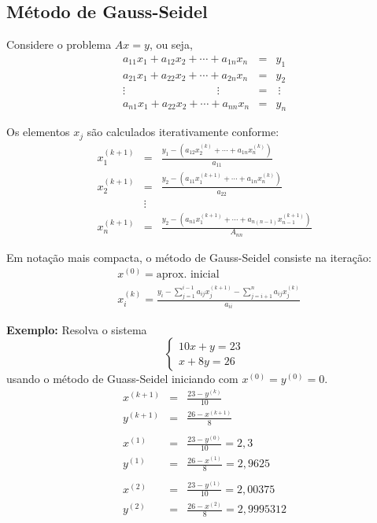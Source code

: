 
\fi

\subsection{Método de Gauss-Seidel}

Considere o problema $Ax=y$, ou seja,
\begin{eqnarray*}
a_{11}x_1+a_{12}x_2+\cdots+a_{1n}x_n&=&y_1\\
a_{21}x_1+a_{22}x_2+\cdots+a_{2n}x_n&=&y_2\\
\vdots \hspace{100pt}\vdots~~~~&=&~\vdots\\
a_{n1}x_1+a_{22}x_2+\cdots+a_{nn}x_n&=&y_n
\end{eqnarray*}

Os elementos $x_j$ são calculados iterativamente conforme:
\begin{eqnarray*}
x_1^{(k+1)}&=& \frac{y_1 - \left(a_{12}x_2^{(k)}+\cdots+a_{1n}x_n^{(k)}\right)}{a_{11}}\\
x_2^{(k+1)}&=&\frac{y_2 - \left(a_{11}x_1^{(k+1)}+\cdots+a_{1n}x_n^{(k)}\right)}{a_{22}}\\
&\vdots&\\
x_n^{(k+1)}&=&\frac{y_2 - \left(a_{n1}x_1^{(k+1)}+\cdots+a_{n(n-1)}x_{n-1}^{(k+1)}\right)}{A_{nn}}
\end{eqnarray*}

Em notação mais compacta, o método de Gauss-Seidel consiste na iteração:
\begin{align*}
  &x^{(0)} = \text{aprox. inicial}\\
  &x_i^{(k)} = \frac{y_i - \displaystyle{\sum_{j=1}^{i-1} a_{ij}x_j^{(k+1)}} - \displaystyle{\sum_{j=i+1}^{n} a_{ij}x_j^{(k)}}}{a_{ii}}
\end{align*}


{\bf Exemplo:} Resolva o sistema $$\left\{\begin{array}{l}10x+y=23\\x+8y=26\end{array}\right.$$
usando o método de Guass-Seidel iniciando com $x^{(0)}=y^{(0)}=0$.
\begin{eqnarray*}
x^{(k+1)}&=&\frac{23-y^{(k)}}{10}\\
y^{(k+1)}&=&\frac{26-x^{(k+1)}}{8}\\
\\
x^{(1)}&=&\frac{23-y^{(0)}}{10}=2,3\\
y^{(1)}&=&\frac{26-x^{(1)}}{8}=2,9625\\
\\
x^{(2)}&=&\frac{23-y^{(1)}}{10}=2,00375  \\
y^{(2)}&=&\frac{26-x^{(2)}}{8}=2,9995312
\end{eqnarray*}

